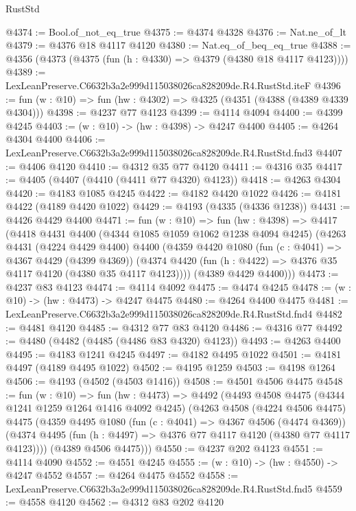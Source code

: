 \begin{lexlean}{RustStd}
\begin{coremodule}
@4374 := Bool.of_not_eq_true
@4375 := @4374 @4328
@4376 := Nat.ne_of_lt
@4379 := @4376 @18 @4117 @4120
@4380 := Nat.eq_of_beq_eq_true
@4388 := @4356 (@4373 (@4375 (fun (h : @4330) => @4379 (@4380 @18 @4117 @4123))))
@4389 := LexLeanPreserve.C6632b3a2e999d115038026ca828209de.R4.RustStd.iteF
@4396 := fun (w : @10) => fun (hw : @4302) => @4325 (@4351 (@4388 (@4389 @4339 @4304)))
@4398 := @4237 @77 @4123
@4399 := @4114 @4094
@4400 := @4399 @4245
@4403 := (w : @10) -> (hw : @4398) -> @4247 @4400
@4405 := @4264 @4304 @4400
@4406 := LexLeanPreserve.C6632b3a2e999d115038026ca828209de.R4.RustStd.fnd3
@4407 := @4406 @4120
@4410 := @4312 @35 @77 @4120
@4411 := @4316 @35
@4417 := @4405 (@4407 (@4410 (@4411 @77 @4320) @4123))
@4418 := @4263 @4304
@4420 := @4183 @1085 @4245
@4422 := @4182 @4420 @1022
@4426 := @4181 @4422 (@4189 @4420 @1022)
@4429 := @4193 (@4335 (@4336 @1238))
@4431 := @4426 @4429 @4400
@4471 := fun (w : @10) =>
  fun (hw : @4398) =>
  @4417
    (@4418
      @4431
      @4400
      (@4344 @1085 @1059 @1062 @1238 @4094 @4245)
      (@4263
        @4431
        (@4224 @4429 @4400)
        @4400
        (@4359
          @4420
          @1080
          (fun (c : @4041) => @4367 @4429 (@4399 @4369))
          (@4374 @4420 (fun (h : @4422) => @4376 @35 @4117 @4120 (@4380 @35 @4117 @4123))))
        (@4389 @4429 @4400)))
@4473 := @4237 @83 @4123
@4474 := @4114 @4092
@4475 := @4474 @4245
@4478 := (w : @10) -> (hw : @4473) -> @4247 @4475
@4480 := @4264 @4400 @4475
@4481 := LexLeanPreserve.C6632b3a2e999d115038026ca828209de.R4.RustStd.fnd4
@4482 := @4481 @4120
@4485 := @4312 @77 @83 @4120
@4486 := @4316 @77
@4492 := @4480 (@4482 (@4485 (@4486 @83 @4320) @4123))
@4493 := @4263 @4400
@4495 := @4183 @1241 @4245
@4497 := @4182 @4495 @1022
@4501 := @4181 @4497 (@4189 @4495 @1022)
@4502 := @4195 @1259
@4503 := @4198 @1264
@4506 := @4193 (@4502 (@4503 @1416))
@4508 := @4501 @4506 @4475
@4548 := fun (w : @10) =>
  fun (hw : @4473) =>
  @4492
    (@4493
      @4508
      @4475
      (@4344 @1241 @1259 @1264 @1416 @4092 @4245)
      (@4263
        @4508
        (@4224 @4506 @4475)
        @4475
        (@4359
          @4495
          @1080
          (fun (c : @4041) => @4367 @4506 (@4474 @4369))
          (@4374 @4495 (fun (h : @4497) => @4376 @77 @4117 @4120 (@4380 @77 @4117 @4123))))
        (@4389 @4506 @4475)))
@4550 := @4237 @202 @4123
@4551 := @4114 @4090
@4552 := @4551 @4245
@4555 := (w : @10) -> (hw : @4550) -> @4247 @4552
@4557 := @4264 @4475 @4552
@4558 := LexLeanPreserve.C6632b3a2e999d115038026ca828209de.R4.RustStd.fnd5
@4559 := @4558 @4120
@4562 := @4312 @83 @202 @4120

\end{coremodule}
\end{lexlean}
